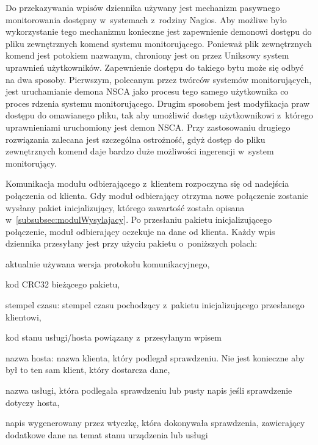 Do przekazywania wpisów dziennika używany jest mechanizm pasywnego
monitorowania dostępny w~systemach z~rodziny Nagios. Aby możliwe było
wykorzystanie tego mechanizmu konieczne jest zapewnienie demonowi
dostępu do pliku zewnętrznych komend systemu monitorującego. Ponieważ
plik zewnętrznych komend jest potokiem nazwanym, chroniony jest on
przez Uniksowy system uprawnień użytkowników. Zapewnienie dostępu do
takiego bytu może się odbyć na dwa sposoby. Pierwszym, polecanym przez
twórców systemów monitorujących, jest uruchamianie demona NSCA jako
procesu tego samego użytkownika co proces rdzenia systemu
monitorującego. Drugim sposobem jest modyfikacja praw dostępu do
omawianego pliku, tak aby umożliwić dostęp użytkownikowi z~którego
uprawnieniami uruchomiony jest demon NSCA. Przy zastosowaniu drugiego
rozwiązania zalecana jest szczególna ostrożność, gdyż dostęp do pliku
zewnętrznych komend daje bardzo duże możliwości ingerencji w~system
monitorujący.

Komunikacja modułu odbierającego z~klientem rozpoczyna się od nadejścia
połączenia od klienta. Gdy moduł odbierający otrzyma nowe połączenie
zostanie wysłany pakiet inicjalizujący, którego zawartość została
opisana w~\ref{subsubsec:modulWysylajacy}. Po przesłaniu pakietu
inicjalizującego połączenie, moduł odbierający oczekuje na dane od
klienta. Każdy wpis dziennika przesyłany jest przy użyciu pakietu
o~poniższych polach:

\begin{description}
\item[wersja protokołu] aktualnie używana wersja protokołu komunikacyjnego,
\item[kod CRC32] kod CRC32 bieżącego pakietu,
\item stempel czasu: stempel czasu pochodzący z~pakietu
  inicjalizującego przesłanego klientowi,
\item[kod statusu] kod stanu usługi/hosta powiązany z~przesyłanym wpisem
\item nazwa hosta: nazwa klienta, który podlegał sprawdzeniu. Nie jest
  konieczne aby był to ten sam klient, który dostarcza dane,
\item[opis usługi] nazwa usługi, która podlegała sprawdzeniu lub pusty
  napis jeśli sprawdzenie dotyczy hosta,
\item[wynik sprawdzenia] napis wygenerowany przez wtyczkę, która
  dokonywała sprawdzenia, zawierający dodatkowe dane na temat stanu
  urządzenia lub usługi
\end{description}

